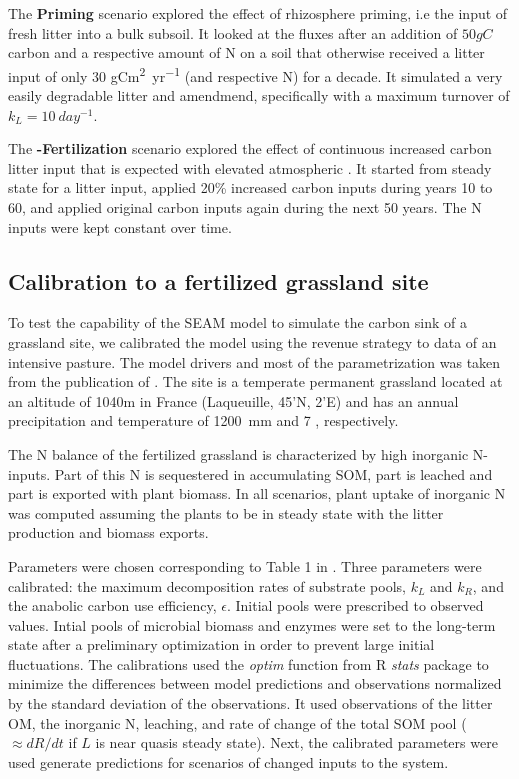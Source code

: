 The \textbf{Priming} scenario explored the effect of rhizosphere priming, i.e
the input of fresh litter into a bulk subsoil. It looked at the fluxes after an
addition of $50gC$ carbon and a respective amount of N on a soil that otherwise
received a litter input of only 30 \unit{gCm^2yr^{-1}} (and
respective N) for a decade. It simulated a very easily degradable litter and
amendmend, specifically with a maximum turnover of $k_L = 10~\unit{day^{-1}}$.

The \textbf{-Fertilization} scenario explored the effect of
continuous increased carbon litter input that is expected with elevated atmospheric .
It started from steady state for a litter input, applied 20\% increased
carbon inputs during years 10 to 60, and applied original carbon inputs again
during the next 50 years. The N inputs were kept constant over time.

\subsection{Calibration to a fertilized grassland site}
\label{sec:methodsPasture}

To test the capability of the SEAM model to simulate the carbon sink of a
grassland site, we calibrated the model using the revenue strategy to data of an
intensive pasture.
The model drivers and most of the parametrization was taken from the publication
of \citep{Perveen14}. The site is a temperate permanent grassland located at an
altitude of 1040m in France (Laqueuille, 45'N,
2'E) and has an annual precipitation and temperature of 1200~mm
and 7 , respectively.

The N balance of the fertilized grassland is characterized by high inorganic
N-inputs. Part of this N is sequestered in accumulating SOM, part is leached and
part is exported with plant biomass. In all scenarios, plant uptake of inorganic N was
computed assuming the plants to be in steady state with the litter
production and biomass exports.
 
Parameters were chosen corresponding to Table 1 in \citep{Perveen14}. Three
parameters were calibrated: the maximum decomposition rates of substrate pools,
$k_L$ and $k_R$, and the anabolic carbon use efficiency, $\epsilon$. Initial
pools were prescribed to observed values. Intial pools of microbial biomass and
enzymes were set to the long-term state after a preliminary optimization in
order to prevent large initial fluctuations. The calibrations used the
\textit{optim} function from R \textit{stats} package \citep{R07} to minimize
the differences between model predictions and observations normalized by the
standard deviation of the observations. It used observations of the litter
OM, the inorganic N, leaching, and rate of change of the total SOM pool
($\approx dR/dt$ if $L$ is near quasis steady state). Next, the calibrated
parameters were used generate predictions for scenarios of changed inputs to
the system.

